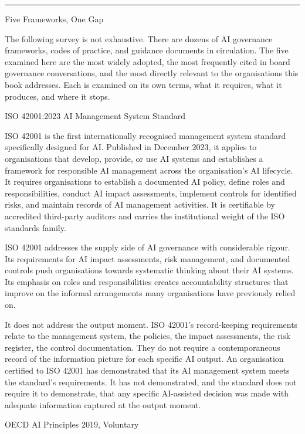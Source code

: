 \begin{center}\rule{0.5\linewidth}{0.5pt}\end{center}

Five Frameworks, One Gap

The following survey is not exhaustive. There are dozens of AI governance frameworks, codes of practice, and guidance documents in circulation. The five examined here are the most widely adopted, the most frequently cited in board governance conversations, and the most directly relevant to the organisations this book addresses. Each is examined on its own terms, what it requires, what it produces, and where it stops.

ISO 42001:2023 AI Management System Standard

ISO 42001 is the first internationally recognised management system standard specifically designed for AI. Published in December 2023, it applies to organisations that develop, provide, or use AI systems and establishes a framework for responsible AI management across the organisation's AI lifecycle. It requires organisations to establish a documented AI policy, define roles and responsibilities, conduct AI impact assessments, implement controls for identified risks, and maintain records of AI management activities. It is certifiable by accredited third-party auditors and carries the institutional weight of the ISO standards family.

ISO 42001 addresses the supply side of AI governance with considerable rigour. Its requirements for AI impact assessments, risk management, and documented controls push organisations towards systematic thinking about their AI systems. Its emphasis on roles and responsibilities creates accountability structures that improve on the informal arrangements many organisations have previously relied on.

It does not address the output moment. ISO 42001's record-keeping requirements relate to the management system, the policies, the impact assessments, the risk register, the control documentation. They do not require a contemporaneous record of the information picture for each specific AI output. An organisation certified to ISO 42001 has demonstrated that its AI management system meets the standard's requirements. It has not demonstrated, and the standard does not require it to demonstrate, that any specific AI-assisted decision was made with adequate information captured at the output moment.

OECD AI Principles 2019, Voluntary

